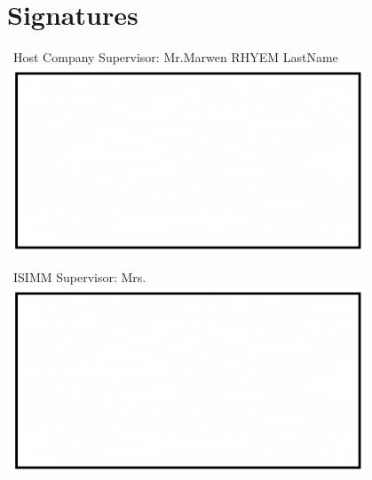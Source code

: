
\chapter*{Signatures}
\thispagestyle{empty}
\bigskip
\begin{center}
\ {Host Company Supervisor: Mr.Marwen RHYEM LastName}
\bigskip
\includegraphics[width=0.8\textwidth]{images/sig.png}
\end{center}

\bigskip
\begin{center}
\ {ISIMM Supervisor: Mrs. }
\bigskip
\includegraphics[width=0.8\textwidth]{images/sig.png}
\end{center}